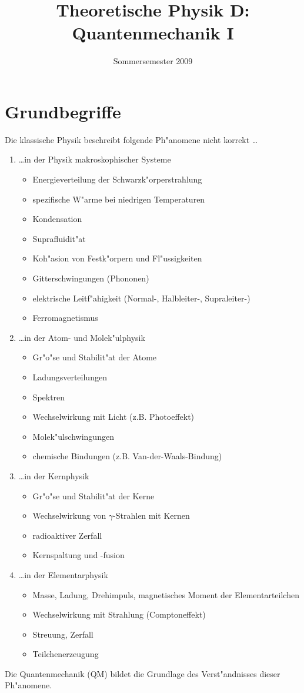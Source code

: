 \documentclass[a4paper]{scrartcl}
\newenvironment{aaufz}
	{\renewcommand{\labelenumi}{\alph{enumi})}
   \renewcommand{\labelenumii}{\alph{enumii})}
   \begin{enumerate}}
  {\end{enumerate}}
\begin{document}
\title{Theoretische Physik D: Quantenmechanik I}
\date{Sommersemester 2009}
\maketitle
\tableofcontents
\section{Grundbegriffe}

Die klassische Physik beschreibt folgende Ph"anomene nicht korrekt \ldots
\begin{aaufz}
	\item \ldots in der Physik makroskophischer Systeme
	\begin{itemize}
		\item Energieverteilung der Schwarzk"orperstrahlung
		\item spezifische W"arme bei niedrigen Temperaturen
		\item Kondensation
		\item Suprafluidit"at
		\item Koh"asion von Festk"orpern und Fl"ussigkeiten
		\item Gitterschwingungen (Phononen)
		\item elektrische Leitf"ahigkeit (Normal-, Halbleiter-, Supraleiter-)
		\item Ferromagnetismus
	\end{itemize}
	\item \ldots in der Atom- und Molek"ulphysik
	\begin{itemize}
		\item Gr"o"se und Stabilit"at der Atome
		\item Ladungsverteilungen
		\item Spektren
		\item Wechselwirkung mit Licht (z.B. Photoeffekt)
		\item Molek"ulschwingungen 
		\item chemische Bindungen (z.B. Van-der-Waals-Bindung)
	\end{itemize}
	\item \ldots in der Kernphysik
	\begin{itemize}
		\item Gr"o"se und Stabilit"at der Kerne
		\item Wechselwirkung von $\gamma$-Strahlen mit Kernen 
		\item radioaktiver Zerfall
		\item Kernspaltung und -fusion
	\end{itemize}
	\item \ldots in der Elementarphysik
	\begin{itemize}
	\item Masse, Ladung, Drehimpuls, magnetisches Moment der Elementarteilchen
	\item Wechselwirkung mit Strahlung (Comptoneffekt)
	\item Streuung, Zerfall
	\item Teilchenerzeugung
	\end{itemize}
\end{aaufz}
Die Quantenmechanik (QM) bildet die Grundlage des Verst"andnisses dieser Ph"anomene.
\end{document}
